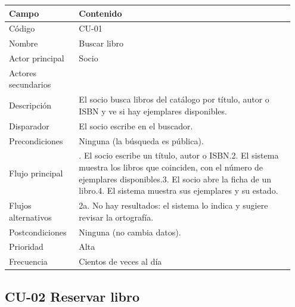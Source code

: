 \documentclass[11pt,a4paper]{article}
\begin{document}
{\small
\begin{longtable}{@{}>{\raggedright\arraybackslash}p{0.233\linewidth}>{\raggedright\arraybackslash}p{0.716\linewidth}@{}}
\toprule
\textbf{Campo} & \textbf{Contenido} \\
\midrule
\endhead
Código & CU-01 \\
Nombre & Buscar libro \\
Actor principal & Socio \\
Actores secundarios &  \\
Descripción & El socio busca libros del catálogo por título, autor o ISBN y ve si hay ejemplares disponibles. \\
Disparador & El socio escribe en el buscador. \\
Precondiciones & Ninguna (la búsqueda es pública). \\
Flujo principal & 1. El socio escribe un título, autor o ISBN.\newline{}2. El sistema muestra los libros que coinciden, con el número de ejemplares disponibles.\newline{}3. El socio abre la ficha de un libro.\newline{}4. El sistema muestra sus ejemplares y su estado. \\
Flujos alternativos & 2a. No hay resultados: el sistema lo indica y sugiere revisar la ortografía. \\
Postcondiciones & Ninguna (no cambia datos). \\
Prioridad & Alta \\
Frecuencia & Cientos de veces al día \\
\bottomrule
\end{longtable}}

\subsection*{CU-02 Reservar libro}
\end{document}
